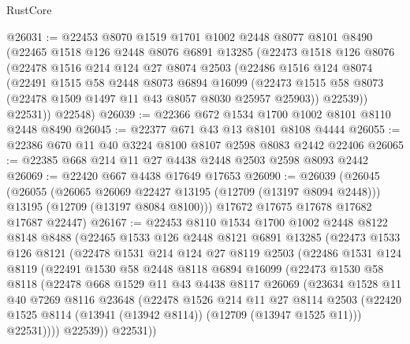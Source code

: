 \begin{lexlean}{RustCore}
\begin{coremodule}
@26031 := @22453
    @8070
    @1519
    @1701
    @1002
    @2448
    @8077
    @8101
    @8490
    (@22465
      @1518
      @126
      @2448
      @8076
      @6891
      @13285
      (@22473
        @1518
        @126
        @8076
        (@22478
          @1516
          @214
          @124
          @27
          @8074
          @2503
          (@22486
            @1516
            @124
            @8074
            (@22491
              @1515
              @58
              @2448
              @8073
              @6894
              @16099
              (@22473 @1515 @58 @8073 (@22478 @1509 @1497 @11 @43 @8057 @8030 @25957 @25903))
              @22539))
          @22531))
      @22548)
@26039 := @22366 @672 @1534 @1700 @1002 @8101 @8110 @2448 @8490
@26045 := @22377 @671 @43 @13 @8101 @8108 @4444
@26055 := @22386 @670 @11 @40 @3224 @8100 @8107 @2598 @8083 @2442 @22406
@26065 := @22385 @668 @214 @11 @27 @4438 @2448 @2503 @2598 @8093 @2442
@26069 := @22420 @667 @4438 @17649 @17653
@26090 := @26039
    (@26045
      (@26055
        (@26065 @26069 @22427 @13195 (@12709 (@13197 @8094 @2448)))
        @13195
        (@12709 (@13197 @8084 @8100)))
      @17672
      @17675
      @17678
      @17682
      @17687
      @22447)
@26167 := @22453
    @8110
    @1534
    @1700
    @1002
    @2448
    @8122
    @8148
    @8488
    (@22465
      @1533
      @126
      @2448
      @8121
      @6891
      @13285
      (@22473
        @1533
        @126
        @8121
        (@22478
          @1531
          @214
          @124
          @27
          @8119
          @2503
          (@22486
            @1531
            @124
            @8119
            (@22491
              @1530
              @58
              @2448
              @8118
              @6894
              @16099
              (@22473
                @1530
                @58
                @8118
                (@22478
                  @668
                  @1529
                  @11
                  @43
                  @4438
                  @8117
                  @26069
                  (@23634
                    @1528
                    @11
                    @40
                    @7269
                    @8116
                    @23648
                    (@22478
                      @1526
                      @214
                      @11
                      @27
                      @8114
                      @2503
                      (@22420 @1525 @8114 (@13941 (@13942 @8114)) (@12709 (@13947 @1525 @11)))
                      @22531))))
              @22539))
          @22531))

\end{coremodule}
\end{lexlean}
